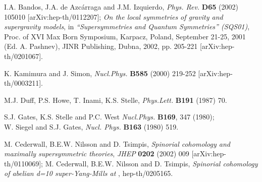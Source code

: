 \documentclass[a4paper,11pt]{article}
\begin{document}
\begin{thebibliography}{99}
I.A. Bandos, J.A. de Azc\'arraga and J.M. Izquierdo,  
{\em Phys. Rev.} {\bf D65} (2002) 105010 [arXiv:hep-th/0112207];   
{\sl On the local symmetries of gravity and supergravity models}, 
in {\it ``Supersymmetries and Quantum Symmetries'' (SQS01)}, 
Proc. of XVI Max Born Symposium, 
Karpacz, Poland, September 21-25, 2001 (Ed. A. Pashnev),
JINR Publishing, Dubna, 2002, pp. 205-221 [arXiv:hep-th/0201067].


K. Kamimura and J. Simon, 
{\em Nucl.Phys.} {\bf B585} (2000) 219-252
[arXiv:hep-th/0003211].


M.J. Duff, P.S. Howe, T. Inami, K.S. Stelle,
{\em Phys.Lett.} {\bf B191} (1987) 70.


S.J. Gates, K.S. Stelle and P.C. West
{\em Nucl.Phys.} {\bf B169}, 347 (1980); 
\\ W. Siegel and S.J. Gates,
{\em Nucl. Phys.} 
{\bf B163} (1980) 519. 


 M. Cederwall, B.E.W. Nilsson and D. Tsimpis, 
{\sl Spinorial cohomology and maximally supersymmetric theories}, 
{\em JHEP} {\bf  0202} (2002) 009 [arXiv:hep-th/0110069]; 
M. Cederwall, B.E.W. Nilsson and D. Tsimpis, 
{\sl Spinorial cohomology of abelian d=10 super-Yang-Mills at 
\coordHE{}}, hep-th/0205165. 


\end{thebibliography}
\end{document}
